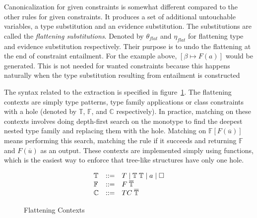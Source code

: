 Canonicalization for given constraints is somewhat different compared to the
other rules for given constraints. It produces a set of additional untouchable
variables, a type substitution and an evidence substitution. The substitutions
are called the \textit{flattening substitutions}. Denoted by $\theta_{flat}$ and
$\eta_{flat}$ for flattening type and evidence substitution respectively. Their
purpose is to undo the flattening at the end of constraint entailment. For the
example above, $[\beta \mapsto F(a)]$ would be generated. This is not needed for
wanted constraints because this happens naturally when the type substitution
resulting from entailment is constructed

The syntax related to the extraction is specified in
figure~\ref{fig:flattening-contexts}. The flattening contexts are simply type
patterns, type family applications or class constraints with a hole (denoted by
$\mathbb{T}$, $\mathbb{F}$, and $\mathbb{C}$ respectively). In practice,
matching on these contexts involves doing depth-first search on the monotype to
find the deepest nested type family and replacing them with the hole. Matching
on $\mathbb{F}[F(\overline{u})]$ means performing this search, matching the rule
if it succeeds and returning $\mathbb{F}$ and $F(\overline{u})$ as an output.
These contexts are implemented simply using functions, which is the easiest way
to enforce that tree-like structures have only one hole.

\begin{figure}
\[
\begin{array}{l c l}
\mathbb{T} &::=& T \mid \mathbb{T} \; \mathbb{T} \mid a \mid \square\\
\mathbb{F} &::=& F \; \overline{\mathbb{T}}\\
\mathbb{C} &::=& TC \; \overline{\mathbb{T}}
\end{array}
\]
\caption{Flattening Contexts}
\label{fig:flattening-contexts}
\end{figure}

